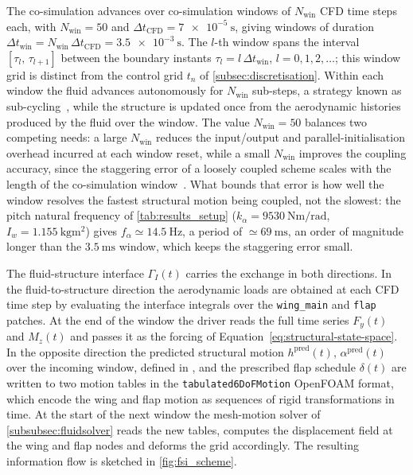 The co-simulation advances over co-simulation windows of $N_{\mathrm{win}}$ CFD time steps each, with $N_{\mathrm{win}} = 50$ and $\Delta t_{\mathrm{CFD}} = \SI{7e-5}{\second}$, giving windows of duration $\Delta t_{\mathrm{win}} = N_{\mathrm{win}}\,\Delta t_{\mathrm{CFD}} = \SI{3.5e-3}{\second}$. The $l$-th window spans the interval $[\tau_l,\,\tau_{l+1}]$ between the boundary instants $\tau_l = l\,\Delta t_{\mathrm{win}}$, $l = 0, 1, 2, \dots$; this window grid is distinct from the control grid $t_n$ of \cref{subsec:discretisation}. Within each window the fluid advances autonomously for $N_{\mathrm{win}}$ sub-steps, a strategy known as sub-cycling~\cite{piperno1995,felippa2001partitioned}, while the structure is updated once from the aerodynamic histories produced by the fluid over the window. The value $N_{\mathrm{win}} = 50$ balances two competing needs: a large $N_{\mathrm{win}}$ reduces the input/output and parallel-initialisation overhead incurred at each window reset, while a small $N_{\mathrm{win}}$ improves the coupling accuracy, since the staggering error of a loosely coupled scheme scales with the length of the co-simulation window~\cite{farhat2006secondorder}. What bounds that error is how well the window resolves the fastest structural motion being coupled, not the slowest: the pitch natural frequency of \cref{tab:results_setup} ($k_\alpha=\SI{9530}{\newton\meter\per\radian}$, $I_w=\SI{1.155}{\kilogram\square\meter}$) gives $f_\alpha\simeq\SI{14.5}{\hertz}$, a period of $\simeq\SI{69}{\milli\second}$, an order of magnitude longer than the $\SI{3.5}{\milli\second}$ window, which keeps the staggering error small.

The fluid-structure interface $\Gamma_I(t)$ carries the exchange in both directions. In the fluid-to-structure direction the aerodynamic loads are obtained at each CFD time step by evaluating the interface integrals  over the \texttt{wing\_main} and \texttt{flap} patches. At the end of the window the driver reads the full time series $F_y(t)$ and $M_z(t)$ and passes it as the forcing of Equation~\eqref{eq:structural-state-space}. In the opposite direction the predicted structural motion $h^{\mathrm{pred}}(t)$, $\alpha^{\mathrm{pred}}(t)$ over the incoming window, defined in , and the prescribed flap schedule $\delta(t)$ are written to two motion tables in the \texttt{tabulated6DoFMotion} OpenFOAM format, which encode the wing and flap motion as sequences of rigid transformations in time. At the start of the next window the mesh-motion solver of \cref{subsubsec:fluidsolver} reads the new tables, computes the displacement field at the wing and flap nodes and deforms the grid accordingly. The resulting information flow is sketched in \cref{fig:fsi_scheme}.

